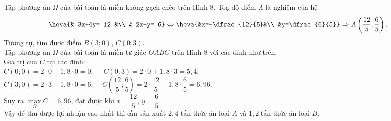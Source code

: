 \begin{bt}
{{}
		\noindent 
		Tập phương án $\Omega$ của bài toán là miền không gạch 
		chéo trên Hình 8. Toạ độ điểm $ A $ là nghiệm của hệ
		\[\heva{& 3x+4y= 12 &\\
			& 2x+y= 6}\Leftrightarrow \heva{&x=-\dfrac{12}{5}&\\
			&y=\dfrac{6}{5}}
		\Rightarrow  A\left(\dfrac{12}{5};\dfrac{6}{5}\right) \text{.}\] 
		Tương tự, tìm được điểm $ B(3; 0) $, $ C(0; 3) $.\\
		Tập phương án $\Omega$ của bài toán là miền tứ giác $ OABC $ trên Hình 8 với các đỉnh như trên.\\
		Giá trị của $ C $ tại các đỉnh:\\ 
		$ C(0; 0) = 2\cdot 0+1{,}8\cdot 0 = 0; $\,\,\,\,\,\, $ C(0; 3) = 2\cdot 0+1{,}8\cdot 3 =5{,}4$;\\
		$ C(3;0) = 2\cdot 3+1{,}8\cdot 0 =6$;\,\,\,\,\,\,\,\,$ C\left(\dfrac{12}{5};\dfrac{6}{5}\right) = 2\cdot \dfrac{12}{5}+1{,}8\cdot\dfrac{6}{5}=6{,}96$.\\
		Suy ra $\mathop{\max}\limits_{\Omega} C=6{,}96$, đạt được khi $ x=\dfrac{12}{5}$, $ y=\dfrac{6}{5}$.\\
		Vậy để thu được lợi nhuận cao nhất thì cần sản xuất $ 2{,}4 $ tấn thức ăn loại $ A $ và $ 1{,}2 $ tấn thức ăn loại $ B $.
	}
\end{bt}

